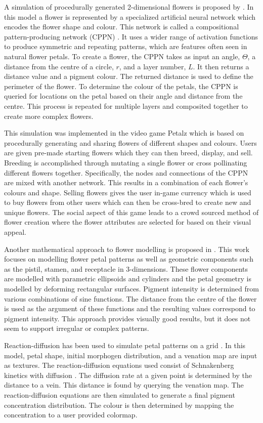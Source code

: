 A simulation of procedurally generated 2-dimensional flowers is proposed by \cite{risi2012}. In this model a flower is represented by a specialized artificial neural network which encodes the flower shape and colour. This network is called a compositional pattern-producing network (CPPN) \cite{stanley2007}. It uses a wider range of activation functions to produce symmetric and repeating patterns, which are features often seen in natural flower petals. To create a flower, the CPPN takes as input an angle, $\Theta$, a distance from the centre of a circle, $r$, and a layer number, $L$. It then returns a distance value and a pigment colour. The returned distance is used to define the perimeter of the flower. To determine the colour of the petals, the CPPN is queried for locations on the petal based on their angle and distance from the centre. This process is repeated for multiple layers and composited together to create more complex flowers. 

This simulation was implemented in the video game Petalz which is based on procedurally generating and sharing flowers of different shapes and colours. Users are given pre-made starting flowers which they can then breed, display, and sell. Breeding is accomplished through mutating a single flower or cross pollinating different flowers together. Specifically, the nodes and connections of the CPPN are mixed with another network. This results in a combination of each flower's colours and shape. Selling flowers gives the user in-game currency which is used to buy flowers from other users which can then be cross-bred to create new and unique flowers. The social aspect of this game leads to a crowd sourced method of flower creation where the flower attributes are selected for based on their visual appeal.

Another mathematical approach to flower modelling is proposed in \cite{lu2014}. This work focuses on modelling flower petal patterns as well as geometric components such as the pistil, stamen, and receptacle in 3-dimensions. These flower components are modelled with parametric ellipsoids and cylinders and the petal geometry is modelled by deforming rectangular surfaces. Pigment intensity is determined from various combinations of sine functions. The distance from the centre of the flower is used as the argument of these functions and the resulting values correspond to pigment intensity. This approach provides visually good results, but it does not seem to support irregular or complex patterns.

Reaction-diffusion has been used to simulate petal patterns on a grid \cite{Zhou2007}. In this model, petal shape, initial morphogen distribution, and a venation map are input as textures. The reaction-diffusion equations used consist of Schnakenberg kinetics with diffusion \cite{schnakenberg1979}. The diffusion rate at a given point is determined by the distance to a vein. This distance is found by querying the venation map. The reaction-diffusion equations are then simulated to generate a final pigment concentration distribution. The colour is then determined by mapping the concentration to a user provided colormap.

